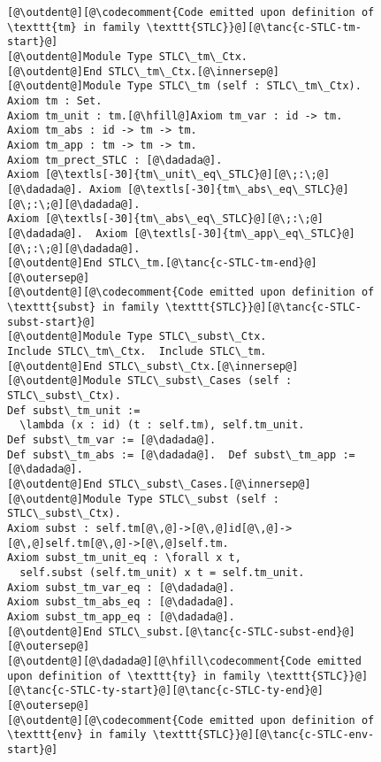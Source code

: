 \begin{figure}
\begin{minipage}{\textwidth}
\begin{multicols}{2}



\newcommand{\innersep}{\vspace{4pt}}
\newcommand{\outersep}{\vspace{4pt}}
\newcommand{\outdent}{\!\!\!}

\begin{lstlisting}
[@\outdent@][@\codecomment{Code emitted upon definition of \texttt{tm} in family \texttt{STLC}}@][@\tanc{c-STLC-tm-start}@]
[@\outdent@]Module Type STLC\_tm\_Ctx.
[@\outdent@]End STLC\_tm\_Ctx.[@\innersep@]
[@\outdent@]Module Type STLC\_tm (self : STLC\_tm\_Ctx).
Axiom tm : Set.
Axiom tm_unit : tm.[@\hfill@]Axiom tm_var : id -> tm.
Axiom tm_abs : id -> tm -> tm.
Axiom tm_app : tm -> tm -> tm.
Axiom tm_prect_STLC : [@\dadada@].
Axiom [@\textls[-30]{tm\_unit\_eq\_STLC}@][@\;:\;@][@\dadada@]. Axiom [@\textls[-30]{tm\_abs\_eq\_STLC}@][@\;:\;@][@\dadada@].
Axiom [@\textls[-30]{tm\_abs\_eq\_STLC}@][@\;:\;@][@\dadada@].  Axiom [@\textls[-30]{tm\_app\_eq\_STLC}@][@\;:\;@][@\dadada@].
[@\outdent@]End STLC\_tm.[@\tanc{c-STLC-tm-end}@][@\outersep@]
[@\outdent@][@\codecomment{Code emitted upon definition of \texttt{subst} in family \texttt{STLC}}@][@\tanc{c-STLC-subst-start}@]
[@\outdent@]Module Type STLC\_subst\_Ctx.
Include STLC\_tm\_Ctx.  Include STLC\_tm.
[@\outdent@]End STLC\_subst\_Ctx.[@\innersep@]
[@\outdent@]Module STLC\_subst\_Cases (self : STLC\_subst\_Ctx).
Def subst\_tm_unit :=
  \lambda (x : id) (t : self.tm), self.tm_unit.
Def subst\_tm_var := [@\dadada@].
Def subst\_tm_abs := [@\dadada@].  Def subst\_tm_app := [@\dadada@].
[@\outdent@]End STLC\_subst\_Cases.[@\innersep@]
[@\outdent@]Module Type STLC\_subst (self : STLC\_subst\_Ctx).
Axiom subst : self.tm[@\,@]->[@\,@]id[@\,@]->[@\,@]self.tm[@\,@]->[@\,@]self.tm.
Axiom subst_tm_unit_eq : \forall x t,
  self.subst (self.tm_unit) x t = self.tm_unit.
Axiom subst_tm_var_eq : [@\dadada@].
Axiom subst_tm_abs_eq : [@\dadada@].
Axiom subst_tm_app_eq : [@\dadada@].
[@\outdent@]End STLC\_subst.[@\tanc{c-STLC-subst-end}@][@\outersep@]
[@\outdent@][@\dadada@][@\hfill\codecomment{Code emitted upon definition of \texttt{ty} in family \texttt{STLC}}@][@\tanc{c-STLC-ty-start}@][@\tanc{c-STLC-ty-end}@][@\outersep@]
[@\outdent@][@\codecomment{Code emitted upon definition of \texttt{env} in family \texttt{STLC}}@][@\tanc{c-STLC-env-start}@]

\end{lstlisting}
\end{multicols}
\end{minipage}
\end{figure}
